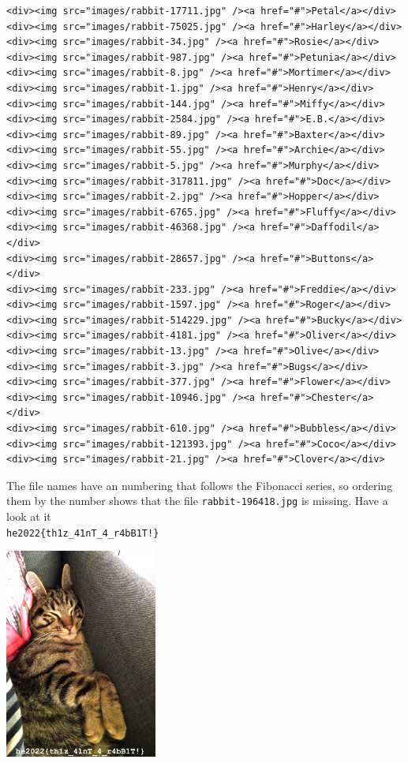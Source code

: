 \noindent\begin{fullwidth}
{\footnotesize\begin{verbatim}
<div><img src="images/rabbit-17711.jpg" /><a href="#">Petal</a></div>
<div><img src="images/rabbit-75025.jpg" /><a href="#">Harley</a></div>
<div><img src="images/rabbit-34.jpg" /><a href="#">Rosie</a></div>
<div><img src="images/rabbit-987.jpg" /><a href="#">Petunia</a></div>
<div><img src="images/rabbit-8.jpg" /><a href="#">Mortimer</a></div>
<div><img src="images/rabbit-1.jpg" /><a href="#">Henry</a></div>
<div><img src="images/rabbit-144.jpg" /><a href="#">Miffy</a></div>
<div><img src="images/rabbit-2584.jpg" /><a href="#">E.B.</a></div>
<div><img src="images/rabbit-89.jpg" /><a href="#">Baxter</a></div>
<div><img src="images/rabbit-55.jpg" /><a href="#">Archie</a></div>
<div><img src="images/rabbit-5.jpg" /><a href="#">Murphy</a></div>
<div><img src="images/rabbit-317811.jpg" /><a href="#">Doc</a></div>
<div><img src="images/rabbit-2.jpg" /><a href="#">Hopper</a></div>
<div><img src="images/rabbit-6765.jpg" /><a href="#">Fluffy</a></div>
<div><img src="images/rabbit-46368.jpg" /><a href="#">Daffodil</a></div>
<div><img src="images/rabbit-28657.jpg" /><a href="#">Buttons</a></div>
<div><img src="images/rabbit-233.jpg" /><a href="#">Freddie</a></div>
<div><img src="images/rabbit-1597.jpg" /><a href="#">Roger</a></div>
<div><img src="images/rabbit-514229.jpg" /><a href="#">Bucky</a></div>
<div><img src="images/rabbit-4181.jpg" /><a href="#">Oliver</a></div>
<div><img src="images/rabbit-13.jpg" /><a href="#">Olive</a></div>
<div><img src="images/rabbit-3.jpg" /><a href="#">Bugs</a></div>
<div><img src="images/rabbit-377.jpg" /><a href="#">Flower</a></div>
<div><img src="images/rabbit-10946.jpg" /><a href="#">Chester</a></div>
<div><img src="images/rabbit-610.jpg" /><a href="#">Bubbles</a></div>
<div><img src="images/rabbit-121393.jpg" /><a href="#">Coco</a></div>
<div><img src="images/rabbit-21.jpg" /><a href="#">Clover</a></div>
\end{verbatim}
}
\end{fullwidth}

\noindent
The file names have an numbering that follows the Fibonacci series, so ordering
them by the number shows that the file \verb+rabbit-196418.jpg+ is missing.
Have a look at it\\
\noindent\verb+he2022{th1z_41nT_4_r4bB1T!}+

\begin{marginfigure}
	\includegraphics[width=50mm]{level3/rabbit-196418.jpg}
\end{marginfigure}



